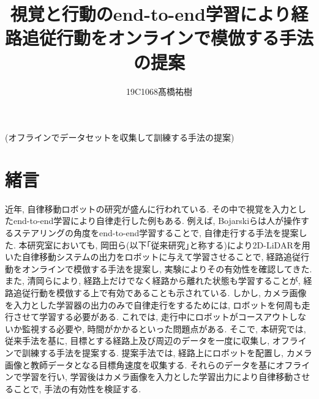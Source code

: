 \documentclass[10pt]{ujarticle}
\begin{document}
    
    \makeatletter
    \title{視覚と行動のend-to-end学習により経路追従行動をオンラインで模倣する手法の提案}{(オフラインでデータセットを収集して訓練する手法の提案)}
    
    \author{19C1068\hspace{.5zw}髙橋祐樹}
    
    \makeatother
    
    
    
    \maketitle
    
    
    \section{緒\hspace{2zw}言}%
    近年, 自律移動ロボットの研究が盛んに行われている. その中で視覚を入力としたend-to-end学習により自律走行した例もある. 例えば, Bojarskiら\cite{bojarski}は人が操作するステアリングの角度をend-to-end学習することで, 自律走行する手法を提案した. 本研究室においても, 岡田ら\cite{si2020-okada}\cite{si2021-okada}(以下｢従来研究｣と称する)により2D-LiDARを用いた自律移動システムの出力をロボットに与えて学習させることで, 経路追従行動をオンラインで模倣する手法を提案し, 実験によりその有効性を確認してきた. また, 清岡ら\cite{si2021-kiyooka}により, 経路上だけでなく経路から離れた状態も学習することが, 経路追従行動を模倣する上で有効であることも示されている. しかし, カメラ画像を入力とした学習器の出力のみで自律走行をするためには, ロボットを何周も走行させて学習する必要がある. これでは, 走行中にロボットがコースアウトしないか監視する必要や, 時間がかかるといった問題点がある. そこで, 本研究では, 従来手法を基に, 目標とする経路上及び周辺のデータを一度に収集し, オフラインで訓練する手法を提案する. 提案手法では, 経路上にロボットを配置し, カメラ画像と教師データとなる目標角速度を収集する. それらのデータを基にオフラインで学習を行い, 学習後はカメラ画像を入力とした学習出力により自律移動させることで, 手法の有効性を検証する.
    
\end{document}
